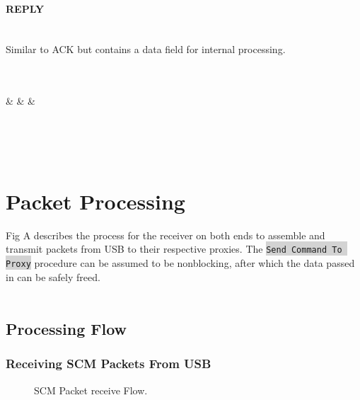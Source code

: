 \documentclass[10pt]{article}
\begin{document}
	\paragraph{REPLY} \mbox{}\\
	Similar to ACK but contains a data field for internal processing.  \\
	\\
	\begin{bytefield}[bitwidth=1.7em]{32}
		 \\
		 &
		 &
		 &
		 \\
		\\
		 \\
	\end{bytefield}\\
	\section{Packet Processing}
	Fig A describes the process for the receiver on both ends to assemble and transmit packets from USB to their respective proxies. The \colorbox{lightgray}{\lstinline{Send Command To Proxy}} procedure can be assumed to be nonblocking, after which the data passed in can be safely freed. \\
	\\	
	\subsection{Processing Flow}
	\subsubsection{Receiving SCM Packets From USB}
	\begin{figure}[H]
	\begin{center}
		\caption[SCM Packet receive Flow]{SCM Packet receive Flow.}
		
	\end{center}
	\end{figure}
	
\end{document}
